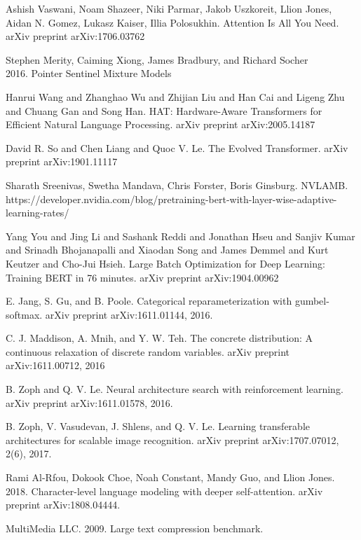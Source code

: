 \documentclass{article}
\begin{document}
\begin{thebibliography}{1}
Ashish Vaswani, Noam Shazeer, Niki Parmar, Jakob Uszkoreit, Llion Jones, Aidan N. Gomez, Lukasz Kaiser, Illia Polosukhin.
Attention Is All You Need. arXiv preprint arXiv:1706.03762

Stephen Merity, Caiming Xiong, James Bradbury, and Richard Socher \\ 2016. Pointer Sentinel Mixture Models

Hanrui Wang and Zhanghao Wu and Zhijian Liu and Han Cai and Ligeng Zhu and Chuang Gan and Song Han. HAT: Hardware-Aware Transformers for Efficient Natural Language Processing. arXiv preprint arXiv:2005.14187

David R. So and Chen Liang and Quoc V. Le. The Evolved Transformer. arXiv preprint arXiv:1901.11117

Sharath Sreenivas, Swetha Mandava, Chris Forster, Boris Ginsburg. NVLAMB. https://developer.nvidia.com/blog/pretraining-bert-with-layer-wise-adaptive-learning-rates/

Yang You and Jing Li and Sashank Reddi and Jonathan Hseu and Sanjiv Kumar and Srinadh Bhojanapalli and Xiaodan Song and James Demmel and Kurt Keutzer and Cho-Jui Hsieh. Large Batch Optimization for Deep Learning: Training BERT in 76 minutes. arXiv preprint arXiv:1904.00962

E. Jang, S. Gu, and B. Poole. Categorical reparameterization with gumbel-softmax. arXiv preprint arXiv:1611.01144, 2016.

C. J. Maddison, A. Mnih, and Y. W. Teh. The concrete distribution: A continuous relaxation of discrete random variables. arXiv preprint arXiv:1611.00712, 2016

B. Zoph and Q. V. Le. Neural architecture search with reinforcement learning. arXiv preprint arXiv:1611.01578, 2016.

B. Zoph, V. Vasudevan, J. Shlens, and Q. V. Le. Learning transferable architectures for scalable image recognition.
arXiv preprint arXiv:1707.07012, 2(6), 2017.

Rami Al-Rfou, Dokook Choe, Noah Constant, Mandy Guo, and Llion Jones. 2018. Character-level language modeling with deeper self-attention. arXiv preprint arXiv:1808.04444.

MultiMedia LLC. 2009. Large text compression benchmark.


\end{thebibliography}
\end{document}

